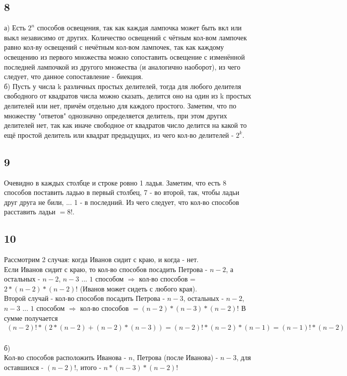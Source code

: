 		
		\subsection{8}
		а)
		Есть $2^n$ способов освещения, так как каждая лампочка может быть вкл или выкл независимо от других. Количество освещений с чётным кол-вом лампочек равно кол-ву освещений с нечётным кол-вом лампочек, так как каждому освещению из первого множества можно сопоставить освещение с изменённой последней лампочкой из другого множества (и аналогично наоборот), из чего следует, что данное сопоставление - биекция.
		\\
		б)
		Пусть у числа k различных простых делителей, тогда для любого делителя свободного от квадратов числа можно сказать, делится оно на один из k простых делителей или нет, причём отдельно для каждого простого. Заметим, что по множеству "ответов" однозначно определяется делитель, при этом других делителей нет, так как иначе свободное от квадратов число делится на какой то ещё простой делитель или квадрат предыдущих, из чего кол-во делителей - $2^k$.
		
		\subsection{9}
		Очевидно в каждых столбце и строке ровно 1 ладья. 
		\newline 
		Заметим, что есть 8 способов поставить ладью в первый столбец, 7 - во второй, так, чтобы ладьи друг друга не били, ... 1 - в последний.
		Из чего следует, что кол-во способов расставить ладьи $= 8!$.
		\newpage
		\subsection{10}
		Рассмотрим 2 случая: когда Иванов сидит с краю, и когда - нет.\\
        Если Иванов сидит с краю, то кол-во способов посадить Петрова - $n - 2$, а остальных - $n - 2$, $n - 3$ ... $1$ способом $\Rightarrow$ кол-во способов = $2*(n - 2)*(n - 2)!$ (Иванов может сидеть с любого края).\\
        Второй случай - кол-во способов посадить Петрова - $n - 3$, остальных - $n - 2$, $n - 3$ ... $1$ способом $\Rightarrow$ кол-во способов $= (n - 2)*(n - 3)*(n - 2)!$
        В сумме получается 
        \begin{gather*}
        (n - 2)!*(2*(n - 2) + (n - 2)*(n - 3)) = (n - 2)!*(n - 2)*(n - 1) = (n - 1)!*(n - 2)
        \end{gather*}
        \\
        б)\\
        Кол-во способов расположить Иванова - $n$, Петрова (после Иванова) - $n - 3$, для оставшихся - $(n - 2)!$, итого - $n*(n - 3)*(n - 2)!$

